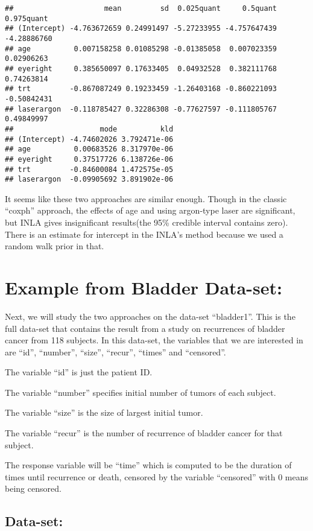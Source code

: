 \documentclass[]{article}
\begin{document}
\begin{verbatim}
##                     mean         sd  0.025quant     0.5quant  0.975quant
## (Intercept) -4.763672659 0.24991497 -5.27233955 -4.757647439 -4.28886760
## age          0.007158258 0.01085298 -0.01385058  0.007023359  0.02906263
## eyeright     0.385650097 0.17633405  0.04932528  0.382111768  0.74263814
## trt         -0.867087249 0.19233459 -1.26403168 -0.860221093 -0.50842431
## laserargon  -0.118785427 0.32286308 -0.77627597 -0.111805767  0.49849997
##                    mode          kld
## (Intercept) -4.74602026 3.792471e-06
## age          0.00683526 8.317970e-06
## eyeright     0.37517726 6.138726e-06
## trt         -0.84600084 1.472575e-05
## laserargon  -0.09905692 3.891902e-06
\end{verbatim}

It seems like these two approaches are similar enough. Though in the
classic ``coxph'' approach, the effects of age and using argon-type
laser are significant, but INLA gives insignificant results(the 95\%
credible interval contains zero). There is an estimate for intercept in
the INLA's method because we used a random walk prior in that.

\hypertarget{example-from-bladder-data-set}{%
\section{Example from Bladder
Data-set:}\label{example-from-bladder-data-set}}

Next, we will study the two approaches on the data-set ``bladder1''.
This is the full data-set that contains the result from a study on
recurrences of bladder cancer from 118 subjects. In this data-set, the
variables that we are interested in are ``id'', ``number'', ``size'',
``recur'', ``times'' and ``censored''.

The variable ``id'' is just the patient ID.

The variable ``number'' specifies initial number of tumors of each
subject.

The variable ``size'' is the size of largest initial tumor.

The variable ``recur'' is the number of recurrence of bladder cancer for
that subject.

The response variable will be ``time'' which is computed to be the
duration of times until recurrence or death, censored by the variable
``censored'' with 0 means being censored.

\hypertarget{data-set-1}{%
\subsection{Data-set:}\label{data-set-1}}
\end{document}
